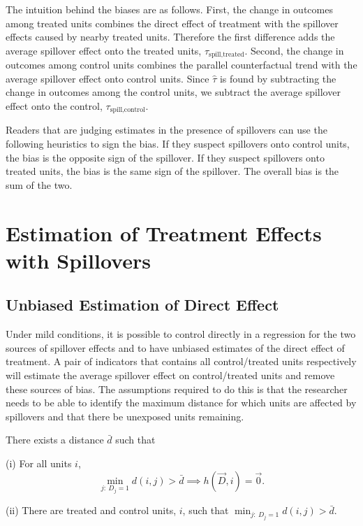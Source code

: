 \documentclass[11pt]{article}
\begin{document}
The intuition behind the biases are as follows. First, the change in outcomes among treated units combines the direct effect of treatment with the spillover effects caused by nearby treated units. Therefore the first difference adds the average spillover effect onto the treated units, $\tau_{\text{spill,treated}}$. Second, the change in outcomes among control units combines the parallel counterfactual trend with the average spillover effect onto control units. Since $\hat{\tau}$ is found by subtracting the change in outcomes among the control units, we subtract the average spillover effect onto the control, $\tau_{\text{spill,control}}$. 

Readers that are judging estimates in the presence of spillovers can use the following heuristics to sign the bias. If they suspect spillovers onto control units, the bias is the opposite sign of the spillover. If they suspect spillovers onto treated units, the bias is the same sign of the spillover. The overall bias is the sum of the two.



\section{Estimation of Treatment Effects with Spillovers}
\label{sec:estimation}

\subsection{Unbiased Estimation of Direct Effect}\label{sec:remove_bias}

Under mild conditions, it is possible to control directly in a regression for the two sources of spillover effects and to have unbiased estimates of the direct effect of treatment. A pair of indicators that contains all control/treated units respectively will estimate the average spillover effect on control/treated units and remove these sources of bias. The assumptions required to do this is that the researcher needs to be able to identify the maximum distance for which units are affected by spillovers and that there be unexposed units remaining.

\begin{assumption}\label{assumption:local}
    There exists a distance $\bar{d}$ such that 
    
    (i) For all units $i$,
    \[ 
        \min_{j: \ D_j = 1} d(i,j) > \bar{d} \implies h(\vec{D}, i) = \vec{0}. 
    \]

    (ii) There are treated and control units, $i$, such that $\min_{j: \ D_j = 1} d(i,j) > \bar{d}$.


\end{assumption}
\end{document}
